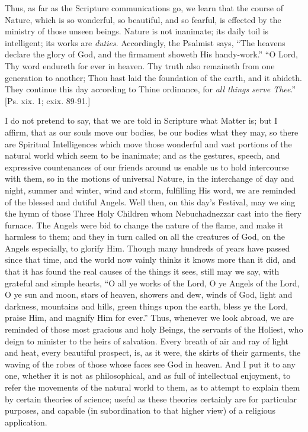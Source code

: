 Thus, as far as the Scripture communications go, we learn that the
course of Nature, which is so wonderful, so beautiful, and so fearful,
is effected by the ministry of those unseen beings. Nature is not
inanimate; its daily toil is intelligent; its works are \emph{duties}.
Accordingly, the Psalmist says, ``The heavens declare the glory of
God, and the firmament showeth His handy-work.'' ``O Lord, Thy
word endureth for ever in heaven. Thy truth also remaineth from one
generation to another; Thou hast laid the foundation of the earth, and
it abideth. They continue this day according to Thine ordinance, for \emph{all
things serve Thee}.'' [Ps. xix. 1; cxix. 89-91.]

I do not pretend to say, that we are told in Scripture what Matter
is; but I affirm, that as our souls move our bodies, be our bodies what
they may, so there are Spiritual Intelligences which move those
wonderful and vast portions of the natural world which seem to be
inanimate; and as the gestures, speech, and expressive countenances of
our friends around us enable us to hold intercourse with them, so in the
motions of universal Nature, in the interchange of day and night, summer
and winter, wind and storm, fulfilling His word, we are reminded of the
blessed and dutiful Angels. Well then, on this day's Festival, may we
sing the hymn of those Three Holy Children whom Nebuchadnezzar cast into
the fiery furnace. The Angels were bid to change the nature of the
flame, and make it harmless to them; and they in turn called on all the
creatures of God, on the Angels especially, to glorify Him. Though many
hundreds of years have passed since that time, and the world now vainly
thinks it knows more than it did, and that it has found the real causes
of the things it sees, still may we say, with grateful and simple
hearts, ``O all ye works of the Lord, O ye Angels of the Lord, O ye
sun and moon, stars of heaven, showers and dew, winds of God, light and
darkness, mountains and hills, green things upon the earth, bless ye the
Lord, praise Him, and magnify Him for ever.'' Thus, whenever we look
abroad, we are reminded of those most gracious and holy Beings, the
servants of the Holiest, who deign to minister to the heirs of
salvation. Every breath of air and ray of light and heat, every
beautiful prospect, is, as it were, the skirts of their garments, the
waving of the robes of those whose faces see God in heaven. And I put it
to any one, whether it is not as philosophical, and as full of
intellectual enjoyment, to refer the movements of the natural world to
them, as to attempt to explain them by certain theories of science;
useful as these theories certainly are for particular purposes, and
capable (in subordination to that higher view) of a religious
application.

